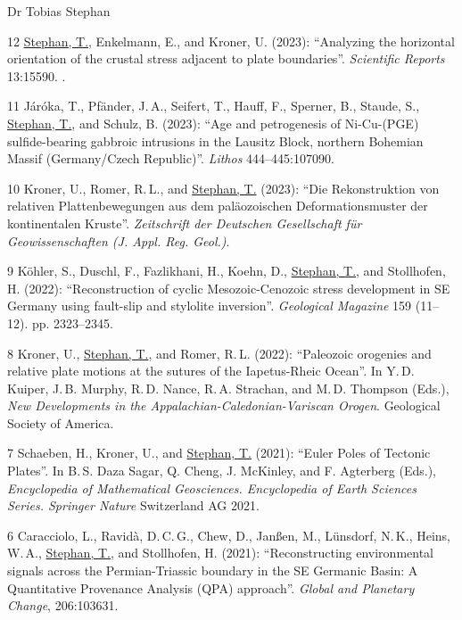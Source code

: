 \documentclass[10pt, paper=letter]{scrartcl} %
\begin{document}
\begin{cv}{\textsf{Dr Tobias Stephan}}
\begin{cvlist}{}
        \item[12] \ul{Stephan, T.}, Enkelmann, E., and Kroner, U. (2023): \enquote{Analyzing the horizontal orientation of the crustal stress adjacent to plate boundaries}. \textit{Scientific Reports} 13:15590. .
        \item[11] Járóka, T.,  Pfänder, J.\,A., Seifert, T., Hauff, F., Sperner, B., Staude, S., \ul{Stephan, T.}, and Schulz, B. (2023): \enquote{Age and petrogenesis of Ni-Cu-(PGE) sulfide-bearing gabbroic intrusions in the Lausitz Block, northern Bohemian Massif (Germany/Czech Republic)}. \textit{Lithos} 444--445:107090. 
        \item[10] Kroner, U., Romer, R.\,L., and \ul{Stephan, T.} (2023): \enquote{Die Rekonstruktion von relativen Plattenbewegungen aus dem paläozoischen Deformationsmuster der kontinentalen Kruste}. \textit{Zeitschrift der Deutschen Gesellschaft für Geowissenschaften (J. Appl. Reg. Geol.)}. 
        \item[9] K\"ohler, S., Duschl, F., Fazlikhani, H., Koehn, D., \ul{Stephan, T.}, and Stollhofen, H. (2022): \enquote{Reconstruction of cyclic Mesozoic-Cenozoic stress development in SE Germany using fault-slip and stylolite inversion}. \textit{Geological Magazine} 159 (11--12). pp. 2323--2345.\newline
        \item[8] Kroner, U., \ul{Stephan, T.}, and Romer, R.\,L. (2022): \enquote{Paleozoic orogenies and relative plate motions at the sutures of the Iapetus-Rheic Ocean}. In Y.\,D. Kuiper, J.\,B. Murphy, R.\,D. Nance, R.\,A. Strachan, and M.\,D. Thompson (Eds.), \textit{New Developments in the Appalachian-Caledonian-Variscan Orogen}. Geological Society of America. 
        \item[7] Schaeben, H., Kroner, U., and \ul{Stephan, T.} (2021): \enquote{Euler Poles of Tectonic Plates}. In B.\,S. Daza Sagar, Q. Cheng, J. McKinley, and F. Agterberg (Eds.), \textit{Encyclopedia of Mathematical Geosciences. Encyclopedia of Earth Sciences Series. Springer Nature} Switzerland AG 2021. 
        \item[6] Caracciolo, L., Ravid\`a, D.\,C.\,G., Chew, D., Jan{\ss}en, M., L\"unsdorf, N.\,K., Heins, W.\,A., \ul{Stephan, T.}, and Stollhofen, H. (2021): \enquote{Reconstructing environmental signals across the Permian-Triassic boundary in the SE Germanic Basin: A Quantitative Provenance Analysis (QPA) approach}. \textit{Global and Planetary Change}, 206:103631.  

\end{cvlist}
\end{cv}
\end{document}
